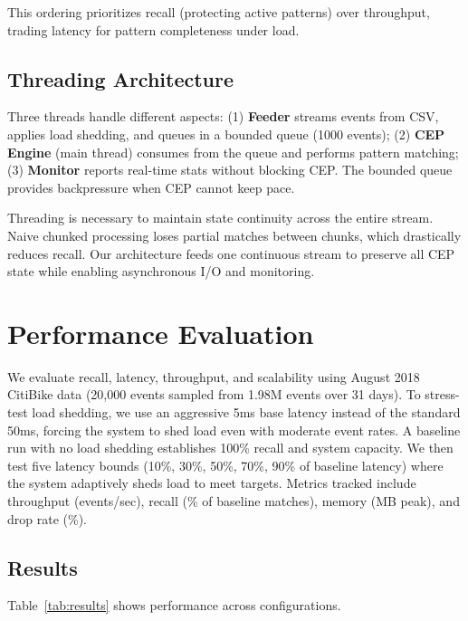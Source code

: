 \documentclass[sigconf]{acmart}
\begin{document}
This ordering prioritizes recall (protecting active patterns) over throughput, trading latency for pattern completeness under load.

\subsection{Threading Architecture}

Three threads handle different aspects: (1) \textbf{Feeder} streams events from CSV, applies load shedding, and queues in a bounded queue (1000 events); (2) \textbf{CEP Engine} (main thread) consumes from the queue and performs pattern matching; (3) \textbf{Monitor} reports real-time stats without blocking CEP. The bounded queue provides backpressure when CEP cannot keep pace.

Threading is necessary to maintain state continuity across the entire stream. Naive chunked processing loses partial matches between chunks, which drastically reduces recall. Our architecture feeds one continuous stream to preserve all CEP state while enabling asynchronous I/O and monitoring.

\section{Performance Evaluation}

We evaluate recall, latency, throughput, and scalability using August 2018 CitiBike data (20,000 events sampled from 1.98M events over 31 days). To stress-test load shedding, we use an aggressive 5ms base latency instead of the standard 50ms, forcing the system to shed load even with moderate event rates. A baseline run with no load shedding establishes 100\% recall and system capacity. We then test five latency bounds (10\%, 30\%, 50\%, 70\%, 90\% of baseline latency) where the system adaptively sheds load to meet targets. Metrics tracked include throughput (events/sec), recall (\% of baseline matches), memory (MB peak), and drop rate (\%).

\subsection{Results}

Table~\ref{tab:results} shows performance across configurations.
\end{document}
